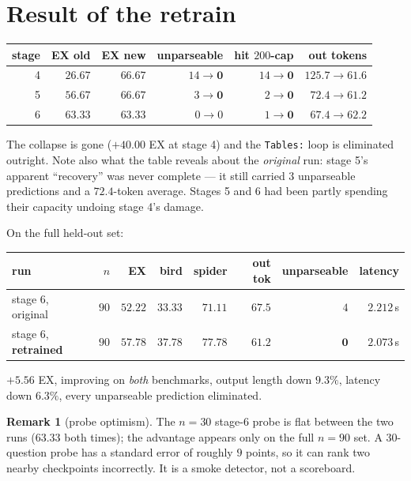 \documentclass[11pt]{article}
\theoremstyle{definition}
\newtheorem{remark}[theorem]{Remark}
\begin{document}
\section{Result of the retrain}

\begin{center}
\begin{tabular}{rrrrrr}
\toprule
stage & EX old & EX new & unparseable & hit $200$-cap & out tokens \\
\midrule
4 & $26.67$ & $\mathbf{66.67}$ & $14 \to \mathbf{0}$ & $14\to\mathbf{0}$ & $125.7\to\mathbf{61.6}$ \\
5 & $56.67$ & $\mathbf{66.67}$ & $3 \to \mathbf{0}$  & $2\to\mathbf{0}$  & $72.4\to\mathbf{61.2}$ \\
6 & $63.33$ & $63.33$          & $0 \to 0$           & $1\to\mathbf{0}$  & $67.4\to\mathbf{62.2}$ \\
\bottomrule
\end{tabular}
\end{center}

The collapse is gone ($+40.00$ EX at stage 4) and the \texttt{Tables:} loop is eliminated outright. Note also what the table reveals about the \emph{original} run: stage 5's apparent ``recovery'' was never complete --- it still carried $3$ unparseable predictions and a $72.4$-token average. Stages 5 and 6 had been partly spending their capacity undoing stage 4's damage.

On the full held-out set:

\begin{center}
\begin{tabular}{lrrrrrrr}
\toprule
run & $n$ & EX & bird & spider & out tok & unparseable & latency \\
\midrule
stage 6, original          & $90$ & $52.22$ & $33.33$ & $71.11$ & $67.5$ & $4$ & $2.212$\,s \\
stage 6, \textbf{retrained} & $90$ & $\mathbf{57.78}$ & $\mathbf{37.78}$ & $\mathbf{77.78}$ & $\mathbf{61.2}$ & $\mathbf{0}$ & $\mathbf{2.073}$\,s \\
\bottomrule
\end{tabular}
\end{center}

$+5.56$ EX, improving on \emph{both} benchmarks, output length down $9.3\%$, latency down $6.3\%$, every unparseable prediction eliminated.

\begin{remark}[probe optimism]
The $n=30$ stage-6 probe is flat between the two runs ($63.33$ both times); the advantage appears only on the full $n=90$ set. A $30$-question probe has a standard error of roughly $9$ points, so it can rank two nearby checkpoints incorrectly. It is a smoke detector, not a scoreboard.
\end{remark}
\end{document}
